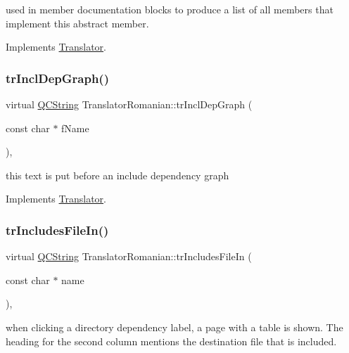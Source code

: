 used in member documentation blocks to produce a list of all members that implement this abstract member. 

Implements \mbox{\hyperlink{class_translator}{Translator}}.

\mbox{\label{class_translator_romanian_a027372b374d3b73ceca55c217a2b0918}} 
\subsubsection{\texorpdfstring{trInclDepGraph()}{trInclDepGraph()}}
{\footnotesize\ttfamily virtual \mbox{\hyperlink{class_q_c_string}{Q\+C\+String}} Translator\+Romanian\+::tr\+Incl\+Dep\+Graph (\begin{DoxyParamCaption}\item[{const char $\ast$}]{f\+Name }\end{DoxyParamCaption})\hspace{0.3cm}{\ttfamily [inline]}, {\ttfamily [virtual]}}

this text is put before an include dependency graph 

Implements \mbox{\hyperlink{class_translator}{Translator}}.

\mbox{\label{class_translator_romanian_a3fc63e1f6dc14d0719731cc63588813e}} 
\subsubsection{\texorpdfstring{trIncludesFileIn()}{trIncludesFileIn()}}
{\footnotesize\ttfamily virtual \mbox{\hyperlink{class_q_c_string}{Q\+C\+String}} Translator\+Romanian\+::tr\+Includes\+File\+In (\begin{DoxyParamCaption}\item[{const char $\ast$}]{name }\end{DoxyParamCaption})\hspace{0.3cm}{\ttfamily [inline]}, {\ttfamily [virtual]}}

when clicking a directory dependency label, a page with a table is shown. The heading for the second column mentions the destination file that is included. 

